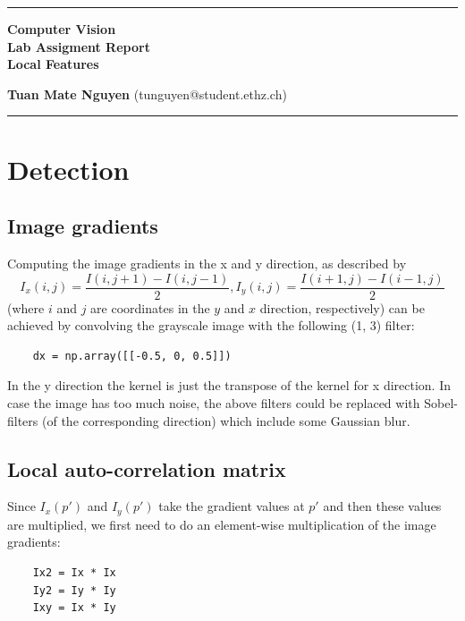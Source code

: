 \documentclass[10pt,a4paper,twoside]{article}
\begin{document}
\begin{center}
\hrule

\vspace{.4cm}
{\bf {\Huge Computer Vision} \\ {\huge Lab Assigment Report} \\ {\Large Local Features}}
\vspace{.2cm}
\end{center}
{\bf Tuan Mate Nguyen}  (tunguyen@student.ethz.ch)
\hrule



\section{Detection}
\subsection{Image gradients}

Computing the image gradients in the x and y direction, as described by 
\[ I_x(i,j) = \frac{I(i, j+1) - I(i,j-1)}{2}, I_y(i,j) = \frac{I(i+1, j) - I(i-1,j)}{2}\]
(where $i$ and $j$ are coordinates in the $y$ and $x$ direction, respectively) can be achieved by convolving the grayscale image with the following (1, 3) filter:
\begin{verbatim}
    dx = np.array([[-0.5, 0, 0.5]])
\end{verbatim}

In the y direction the kernel is just the transpose of the kernel for x
direction. In case the image has too much noise, the above filters could
be replaced with Sobel-filters (of the corresponding direction) which include some Gaussian blur.


\subsection{Local auto-correlation matrix}

Since $I_x(p')$ and $I_y(p')$ take the gradient values at $p'$ and then these values
are multiplied, we first need to do an element-wise multiplication of the image
gradients:
\begin{verbatim}
    Ix2 = Ix * Ix
    Iy2 = Iy * Iy
    Ixy = Ix * Iy
\end{verbatim}
\end{document}
